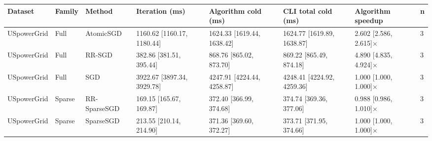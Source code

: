 \begin{tabular}{llllllll}
\hline
Dataset & Family & Method & Iteration (ms) & Algorithm cold (ms) & CLI total cold (ms) & Algorithm speedup & n \\
\hline
USpowerGrid & Full & AtomicSGD & 1160.62 [1160.17, 1180.44] & 1624.33 [1619.44, 1638.42] & 1624.77 [1619.89, 1638.87] & 2.602 [2.586, 2.615]× & 3 \\
USpowerGrid & Full & RR-SGD & 382.86 [381.51, 395.44] & 868.76 [865.02, 873.70] & 869.22 [865.49, 874.18] & 4.890 [4.835, 4.924]× & 3 \\
USpowerGrid & Full & SGD & 3922.67 [3897.34, 3929.78] & 4247.91 [4224.44, 4258.87] & 4248.41 [4224.92, 4259.36] & 1.000 [1.000, 1.000]× & 3 \\
USpowerGrid & Sparse & RR-SparseSGD & 169.15 [165.67, 169.87] & 372.40 [366.99, 374.68] & 374.74 [369.36, 377.06] & 0.988 [0.986, 1.010]× & 3 \\
USpowerGrid & Sparse & SparseSGD & 213.55 [210.14, 214.90] & 371.36 [369.60, 372.27] & 373.71 [371.95, 374.66] & 1.000 [1.000, 1.000]× & 3 \\
\hline
\end{tabular}
